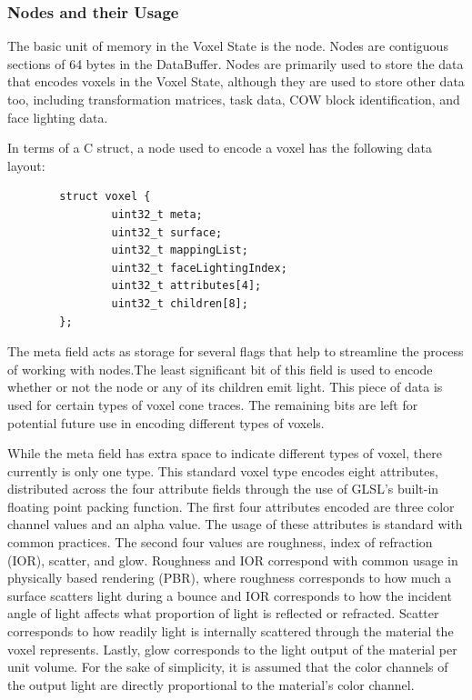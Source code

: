 \documentclass[onecolumn, draftclsnofoot,10pt, compsoc]{IEEEtran}
\newcounter{threesection}[subsubsection]
\newcounter{foursection}[threesection]
\begin{document}
\subsubsection{Nodes and their Usage}


The basic unit of memory in the Voxel State is the node. Nodes are contiguous sections of 64 bytes in the DataBuffer. Nodes are primarily used to store the data that encodes voxels in the Voxel State, although they are used to store other data too, including transformation matrices, task data, COW block identification, and face lighting data.



In terms of a C struct, a node used to encode a voxel has the following data layout:


\begin{verbatim}
        struct voxel {
                uint32_t meta;
                uint32_t surface;
                uint32_t mappingList;
                uint32_t faceLightingIndex;
                uint32_t attributes[4];
                uint32_t children[8];
        };
\end{verbatim}


 The meta field acts as storage for several flags that help to streamline the process of working with nodes.The least significant bit of this field is used to encode whether or not the node or any of its children emit light. This piece of data is used for certain types of voxel cone traces. The remaining bits are left for potential future use in encoding different types of voxels.


While the meta field has extra space to indicate different types of voxel, there currently is only one type. This standard voxel type encodes eight attributes, distributed across the four attribute fields through the use of GLSL’s built-in floating point packing function. The first four attributes encoded are three color channel values and an alpha value. The usage of these attributes is standard with common practices. The second four values are roughness, index of refraction (IOR), scatter, and glow. Roughness and IOR correspond with common usage in physically based rendering (PBR), where roughness corresponds to how much a surface scatters light during a bounce and IOR corresponds to how the incident angle of light affects what proportion of light is reflected or refracted. Scatter corresponds to how readily light is internally scattered through the material the voxel represents. Lastly, glow corresponds to the light output of the material per unit volume. For the sake of simplicity, it is assumed that the color channels of the output light are directly proportional to the material’s color channel.
\end{document}

